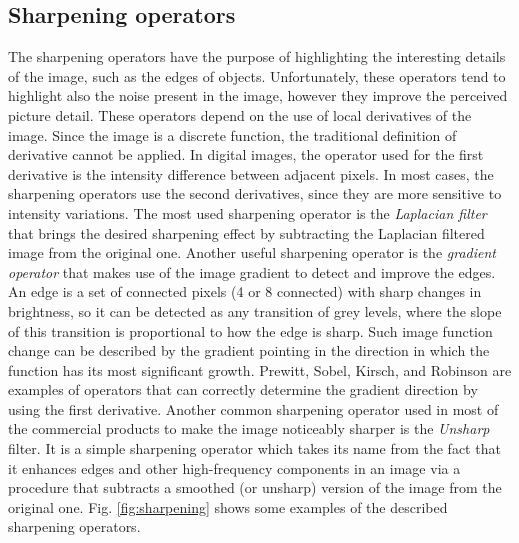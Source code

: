 \subsection{Sharpening operators} %
The sharpening operators have the purpose of highlighting the interesting details of the image, such as the edges of objects. Unfortunately, these operators tend to highlight also the noise present in the image, however they improve the perceived picture detail. These operators depend on the use of local derivatives of the image. Since the image is a discrete function, the traditional definition of derivative cannot be applied.
In digital images, the operator used for the first derivative is the intensity difference between adjacent pixels. In most cases, the sharpening operators use the second derivatives, since they are more sensitive to intensity variations. The most used sharpening operator is the \textit{Laplacian filter} that brings the desired sharpening effect by subtracting the Laplacian filtered image from the original one. Another useful sharpening operator is the \textit{gradient operator} that makes use of the image gradient to detect and improve the edges. An edge is a set of connected pixels (4 or 8 connected) with sharp changes in brightness, so it can be detected as any transition of grey levels, where the slope of this transition is proportional to how the edge is sharp. Such image function change can be described by the gradient pointing in the direction in which the function has its most significant growth. Prewitt, Sobel, Kirsch, and Robinson are examples of operators that can correctly determine the gradient direction by using the first derivative. Another common sharpening operator used in most of the commercial products to make the image noticeably sharper is the \textit{Unsharp} filter. It is a simple sharpening operator which takes its name from the fact that it enhances edges and other high-frequency components in an image via a procedure that subtracts a smoothed (or unsharp) version of the image from the original one. Fig. \ref{fig:sharpening} shows some examples of the described sharpening operators.

